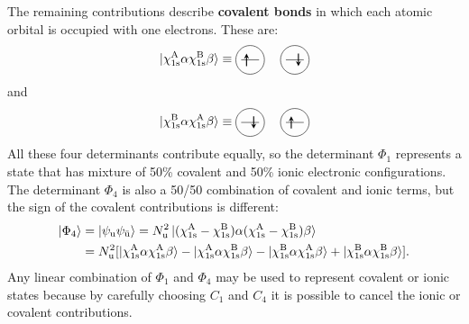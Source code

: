 \documentclass[../Main/chem532-notes.tex]{subfiles}
\begin{document}
The remaining contributions describe \textbf{covalent bonds} in which each atomic orbital is occupied with one electrons. These are:
\begin{equation}
 \ket{\chi_{1\rm s}^{\rm A}\alpha \chi_{1\rm s}^{\rm B}\beta} \equiv 
 \begin{tikzpicture}[baseline={([yshift=-.5ex]current bounding box.center)},vertex/.style={anchor=base, minimum size=18pt, inner sep=2pt}]
    \draw (0.25,0.5) circle (0.4);
    \draw (0,0.5) -- (0.5,0.5);
    \draw[thick,->,>=stealth] (0.15,0.325) -- (0.15,0.675);
    \draw[thick,<-,>=stealth] (1.6,0.325) -- (1.6,0.675);
    \draw (1.5,0.5) circle (0.4);
    \draw (1.25,0.5) -- (1.75,0.5);
  \end{tikzpicture}
\end{equation}
and
\begin{equation}
 \ket{\chi_{1\rm s}^{\rm B}\alpha \chi_{1\rm s}^{\rm A}\beta} \equiv 
 \begin{tikzpicture}[baseline={([yshift=-.5ex]current bounding box.center)},vertex/.style={anchor=base, minimum size=18pt, inner sep=2pt}]
    \draw (0.25,0.5) circle (0.4);
    \draw (0,0.5) -- (0.5,0.5);
    \draw[thick,<-,>=stealth] (0.35,0.325) -- (0.35,0.675);    
    \draw[thick,->,>=stealth] (1.4,0.325) -- (1.4,0.675);
    \draw (1.5,0.5) circle (0.4);
    \draw (1.25,0.5) -- (1.75,0.5);
  \end{tikzpicture}
\end{equation}
All these four determinants contribute equally, so the determinant $\Phi_1$ represents a state that has mixture of 50\% covalent and 50\% ionic electronic configurations.
The determinant $\Phi_4$ is also a 50/50 combination of covalent and ionic terms, but the sign of the covalent contributions is different:
\begin{equation}
\begin{split}
\ket{\Phi_4} &= \ket{\psi_{\mathrm{u}} \psi_{\bar{\mathrm{u}}}} = N_{\mathrm{u}}^2 \ket{ (\chi_{1\rm s}^{\rm A} - \chi_{1\rm s}^{\rm B}) \alpha  (\chi_{1\rm s}^{\rm A} - \chi_{1\rm s}^{\rm B}) \beta} \\
&= N_{\mathrm{u}}^2 [ \ket{\chi_{1\rm s}^{\rm A}\alpha \chi_{1\rm s}^{\rm A}\beta}
- \ket{\chi_{1\rm s}^{\rm A}\alpha \chi_{1\rm s}^{\rm B}\beta}
- \ket{\chi_{1\rm s}^{\rm B}\alpha \chi_{1\rm s}^{\rm A}\beta} 
+\ket{\chi_{1\rm s}^{\rm B}\alpha \chi_{1\rm s}^{\rm B}\beta}].
\end{split}
\end{equation}
Any linear combination of $\Phi_1$ and $\Phi_4$ may be used to represent covalent or ionic states because by carefully choosing $C_1$ and $C_4$ it is possible to cancel the ionic or covalent contributions.
\end{document}
